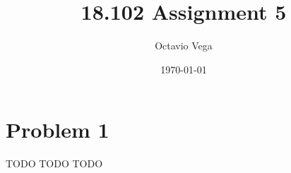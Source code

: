 \documentclass{article}
\title{18.102 Assignment 5}
\author{Octavio Vega}
\date\today
\begin{document}
\maketitle
	
\section*{Problem 1}
TODO TODO TODO 
	
\end{document}
